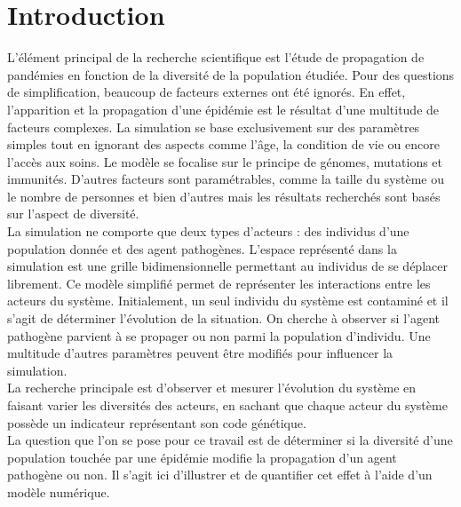 \chapter{Introduction} \label{ch:introduction}

L'élément principal de la recherche scientifique est l'étude de propagation de pandémies en fonction de la diversité de la population étudiée. Pour des questions de simplification, beaucoup de facteurs externes ont été ignorés. En effet, l'apparition et la propagation d'une épidémie est le résultat d'une multitude de facteurs complexes. La simulation se base exclusivement sur des paramètres simples tout en ignorant des aspects comme l'âge, la condition de vie ou encore l'accès aux soins. Le modèle se focalise sur le principe de génomes, mutations et immunités. D'autres facteurs sont paramétrables, comme la taille du système ou le nombre de personnes et bien d'autres mais les résultats recherchés sont basés sur l'aspect de diversité.\\

La simulation ne comporte que deux types d'acteurs : des individus d'une population donnée et des agent pathogènes. L'espace représenté dans la simulation est une grille bidimensionnelle permettant au individus de se déplacer librement. Ce modèle simplifié permet de représenter les interactions entre les acteurs du système. Initialement, un seul individu du système est contaminé et il s'agit de déterminer l'évolution de la situation. On cherche à observer si l'agent pathogène parvient à se propager ou non parmi la population d'individu. Une multitude d'autres paramètres peuvent être modifiés pour influencer la simulation.\\

La recherche principale est d'observer et mesurer l'évolution du système en faisant varier les diversités des acteurs, en sachant que chaque acteur du système possède un indicateur représentant son code génétique.\\

La question que l'on se pose pour ce travail est de déterminer si la diversité d'une population touchée par une épidémie modifie la propagation d'un agent pathogène ou non. Il s'agit ici d'illustrer et de quantifier cet effet à l'aide d'un modèle numérique.